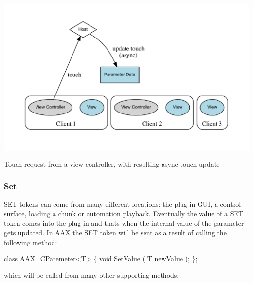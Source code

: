 \begin{DoxyImage}
\includegraphics[width=\textwidth,height=\textheight/2,keepaspectratio=true]{dot_aax_parameter_entities_touch_handled}
\caption{Touch request from a view controller, with resulting async touch update}
\end{DoxyImage}
 \hypertarget{a00352_tokenProtocol_introductionToTokens_set}{}\subsubsection{Set}\label{a00352_tokenProtocol_introductionToTokens_set}
S\+E\+T tokens can come from many different locations\+: the plug-\/in G\+U\+I, a control surface, loading a chunk or automation playback. Eventually the value of a S\+E\+T token comes into the plug-\/in and that\textquotesingle{}s when the internal value of the parameter gets updated. In A\+A\+X the S\+E\+T token will be sent as a result of calling the following method\+:


\begin{DoxyCode}
\textcolor{keyword}{class }AAX\_CParemeter<T>
\{
    \textcolor{keywordtype}{void} SetValue ( T newValue );
\};
\end{DoxyCode}


which will be called from many other supporting methods\+:


